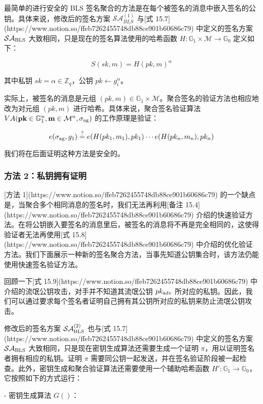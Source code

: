 最简单的进行安全的 BLS 签名聚合的方法是在每个被签名的消息中嵌入签名的公钥。具体来说，修改后的签名方案 $\mathcal{SA}_{BLS}^{(1)}$ 与[式 15.7](https://www.notion.so/ffeb7262455748db88ce901b60686c79) 中定义的签名方案 $\mathcal{SA}_{\rm BLS}$ 大致相同，只是现在的签名算法使用的哈希函数 $H: \mathbb{G}_1 \times \mathcal{M} \to \mathbb{G}_0$ 定义如下：

\[
S(sk,m)=H(pk,m)^\alpha
\]

其中私钥 $sk=\alpha \in \mathbb{Z}_q$，公钥 $pk \leftarrow g_i^\alpha$。

实际上，被签名的消息是元组 $(pk,m)\in \mathbb{G}_1 \times \mathcal{M}$。聚合签名的验证方法也相应地改为对元组 $(pk,m)$ 进行哈希。具体来说，聚合签名验证算法 $VA(\mathbf{pk}\in\mathbb{G}_1^n,\mathbf{m}\in\mathcal{M}^n,\sigma_{\rm ag})$ 的工作原理是验证：

\[
e(\sigma_{\rm ag},g_1)\overset{?}=e(H(pk_1,m_1),pk_1)\cdots e(H(pk_n,m_n),pk_n)
\]

我们将在后面证明这种方法是安全的。

\subsubsection{方法 2：私钥拥有证明}

[方法 1](https://www.notion.so/ffeb7262455748db88ce901b60686c79) 的一个缺点是，当聚合多个相同消息的签名时，我们无法再利用[备注 15.4](https://www.notion.so/ffeb7262455748db88ce901b60686c79) 介绍的快速验证方法。在将公钥嵌入要签名的消息里后，被签名的消息将不再是完全相同的，这使得验证者无法再使用[式 15.8](https://www.notion.so/ffeb7262455748db88ce901b60686c79) 中介绍的优化验证方法。我们下面展示一种新的签名聚合方法，当事先知道公钥集合时，该方法仍能使用快速签名验证方法。

回顾一下[式 15.9](https://www.notion.so/ffeb7262455748db88ce901b60686c79) 中介绍的流氓公钥攻击，对手并不知道其流氓公钥 $pk_{\rm adv}$ 所对应的私钥。因此，我们可以通过要求每个签名者证明自己拥有其公钥所对应的私钥来防止流氓公钥攻击。

修改后的签名方案 $\mathcal{SA}_{\rm BLS}^{(2)}$ 也与[式 15.7](https://www.notion.so/ffeb7262455748db88ce901b60686c79) 中定义的签名方案 $\mathcal{SA}_{\rm BLS}$ 大致相同，只是现在密钥生成算法还需要生成一个证明 $\pi$，用以证明签名者拥有相应的私钥。证明 $\pi$ 需要同公钥一起发送，并在签名验证阶段被一起检查。此外，密钥生成和聚合验证算法还需要使用一个辅助哈希函数 $H':\mathbb{G}_1 \to \mathbb{G}_0$，它按照如下的方式运行：

- 密钥生成算法 $G()$：
    
